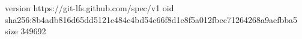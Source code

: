 version https://git-lfs.github.com/spec/v1
oid sha256:8b4adb816d65dd5121e484c4bd54c66f8d1e8f5a012fbec71264268a9aefbba5
size 349692
